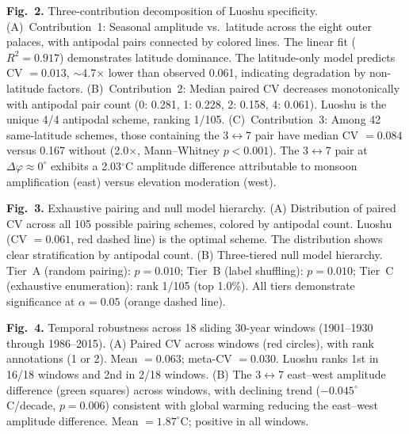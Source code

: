\documentclass[9pt,twocolumn]{article}
\begin{document}
\vspace{6pt}
\noindent\textbf{Fig.~2.} Three-contribution decomposition of Luoshu specificity. (A)~Contribution~1: Seasonal amplitude vs.\ latitude across the eight outer palaces, with antipodal pairs connected by colored lines. The linear fit ($R^2 = 0.917$) demonstrates latitude dominance. The latitude-only model predicts CV $= 0.013$, $\sim$4.7$\times$ lower than observed 0.061, indicating degradation by non-latitude factors. (B)~Contribution~2: Median paired CV decreases monotonically with antipodal pair count (0: 0.281, 1: 0.228, 2: 0.158, 4: 0.061). Luoshu is the unique 4/4 antipodal scheme, ranking 1/105. (C)~Contribution~3: Among 42 same-latitude schemes, those containing the 3$\leftrightarrow$7 pair have median CV $= 0.084$ versus 0.167 without (2.0$\times$, Mann--Whitney $p < 0.001$). The 3$\leftrightarrow$7 pair at $\Delta\varphi \approx 0^\circ$ exhibits a 2.03$^\circ$C amplitude difference attributable to monsoon amplification (east) versus elevation moderation (west).

\vspace{6pt}
\noindent\textbf{Fig.~3.} Exhaustive pairing and null model hierarchy. (A) Distribution of paired CV across all 105 possible pairing schemes, colored by antipodal count. Luoshu (CV $= 0.061$, red dashed line) is the optimal scheme. The distribution shows clear stratification by antipodal count. (B) Three-tiered null model hierarchy. Tier~A (random pairing): $p = 0.010$; Tier~B (label shuffling): $p = 0.010$; Tier~C (exhaustive enumeration): rank 1/105 (top 1.0\%). All tiers demonstrate significance at $\alpha = 0.05$ (orange dashed line).

\vspace{6pt}
\noindent\textbf{Fig.~4.} Temporal robustness across 18 sliding 30-year windows (1901--1930 through 1986--2015). (A) Paired CV across windows (red circles), with rank annotations (1 or 2). Mean $= 0.063$; meta-CV $= 0.030$. Luoshu ranks 1st in 16/18 windows and 2nd in 2/18 windows. (B) The 3$\leftrightarrow$7 east--west amplitude difference (green squares) across windows, with declining trend ($-0.045^\circ$C/decade, $p = 0.006$) consistent with global warming reducing the east--west amplitude difference. Mean $= 1.87^\circ$C; positive in all windows.
\end{document}
